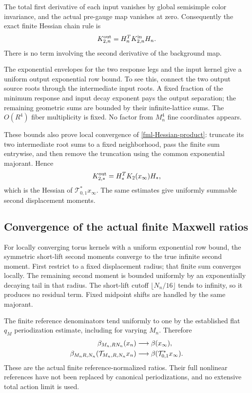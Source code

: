 \documentclass[11pt]{article}
\theoremstyle{remark}
\begin{document}
The total first derivative of each input vanishes by
global semisimple color invariance, and the actual
pre-gauge map vanishes at zero. Consequently the exact
finite Hessian chain rule is
\begin{equation}
                       K_{2,n}^{\rm out}
                           =H_n^T K_{2,n}^{\rm in}H_n.
 \label{fml-Hessian-product}
\end{equation}
There is no term involving the second derivative of
the background map.

The exponential envelopes for the two response legs
and the input kernel give a uniform output exponential
row bound. To see this, connect the two output source
roots through the intermediate input roots. A fixed
fraction of the minimum response and input decay
exponent pays the output separation; the remaining
geometric sums are bounded by their infinite-lattice
sums. The \(O(R^4)\) fiber multiplicity is fixed. No
factor from \(M_n^4\) fine coordinates appears.

These bounds also prove local convergence of
\eqref{fml-Hessian-product}: truncate its two intermediate
root sums to a fixed neighborhood, pass the finite
sum entrywise, and then remove the truncation using
the common exponential majorant. Hence
\begin{equation}
 K_{2,*}^{\rm out}
       =H_*^T K_2(x_\infty)H_*,
 \label{fml-output-kernel-limit}
\end{equation}
which is the Hessian of
\(\mathcal T_{0,1}^*x_\infty\). The same estimates give
uniformly summable second displacement moments.

\subsection{Convergence of the actual finite Maxwell ratios}
\label{fml-moment-section}

For locally converging torus kernels with a uniform
exponential row bound, the symmetric short-lift second
moments converge to the true infinite second moment.
First restrict to a fixed displacement radius; that
finite sum converges locally. The remaining second
moment is bounded uniformly by an exponentially decaying
tail in that radius. The short-lift cutoff
\(\lfloor N_n/16\rfloor\) tends to infinity, so it
produces no residual term. Fixed midpoint shifts are
handled by the same majorant.

The finite reference denominators tend uniformly to one
by the established flat \(q_M\) periodization estimate,
including for varying \(M_n\). Therefore
\begin{align}
 \beta_{M_n,RN_n}(x_n)
                 &\longrightarrow\beta(x_\infty),\notag\\
 \beta_{M_nR,N_n}(\mathcal T_{M_n,R,N_n}x_n)
                 &\longrightarrow
                     \beta(\mathcal T_{0,1}^*x_\infty).
 \label{fml-ratio-limits}
\end{align}
These are the actual finite reference-normalized ratios.
Their full nonlinear references have not been replaced
by canonical periodizations, and no extensive total
action limit is used.
\end{document}
